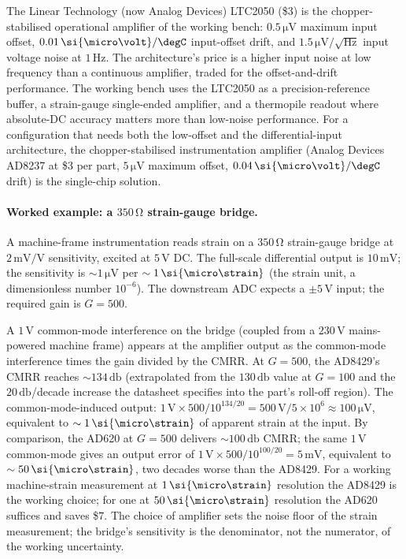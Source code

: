 The Linear Technology (now Analog Devices) LTC2050
\cite{text:ch05t3b-lt-ltc2050-datasheet} (\$$3$) is the
chopper-stabilised operational amplifier of the working bench:
$0.5 \,\si{\micro\volt}$ maximum input offset,
$0.01 \,\si{\micro\volt}/\degC$ input-offset drift, and
$1.5 \,\si{\micro\volt}/\sqrt{\si{\hertz}}$ input voltage noise at
$1 \,\si{\hertz}$. The architecture's price is a higher input noise
at low frequency than a continuous amplifier, traded for the
offset-and-drift performance. The working bench uses the LTC2050 as
a precision-reference buffer, a strain-gauge single-ended amplifier,
and a thermopile readout where absolute-DC accuracy matters more
than low-noise performance. For a configuration that needs both the
low-offset and the differential-input architecture, the
chopper-stabilised instrumentation amplifier (Analog Devices AD8237
at \$$3$ per part, $5 \,\si{\micro\volt}$ maximum offset,
$0.04 \,\si{\micro\volt}/\degC$ drift) is the single-chip solution.

\paragraph{Worked example: a $350 \,\si{\ohm}$ strain-gauge bridge.}
A machine-frame instrumentation reads strain on a
$350 \,\si{\ohm}$ strain-gauge bridge at $2 \,\si{\milli\volt}/
\si{\volt}$ sensitivity, excited at $5 \,\si{\volt}$ DC. The
full-scale differential output is $10 \,\si{\milli\volt}$; the
sensitivity is $\sim 1 \,\si{\micro\volt}$ per
$\sim 1 \,\si{\micro\strain}$ (the strain unit, a dimensionless
number $10^{-6}$). The downstream ADC expects a $\pm 5
\,\si{\volt}$ input; the required gain is $G = 500$.

A $1 \,\si{\volt}$ common-mode interference on the bridge (coupled
from a $230 \,\si{\volt}$ mains-powered machine frame) appears at
the amplifier output as the common-mode interference times the gain
divided by the CMRR. At $G = 500$, the AD8429's CMRR reaches
$\sim 134 \,\si{\decibel}$ (extrapolated from the $130 \,\si{
\decibel}$ value at $G = 100$ and the $20 \,\si{\decibel}$/decade
increase the datasheet specifies into the part's roll-off region).
The common-mode-induced output: $1 \,\si{\volt} \times 500 /
10^{134/20} = 500 \,\si{\volt} / 5 \times 10^{6} \approx
100 \,\si{\micro\volt}$, equivalent to $\sim 1 \,\si{\micro
\strain}$ of apparent strain at the input. By comparison, the AD620
at $G = 500$ delivers $\sim 100 \,\si{\decibel}$ CMRR; the same
$1 \,\si{\volt}$ common-mode gives an output error of
$1 \,\si{\volt} \times 500 / 10^{100/20} = 5 \,\si{\milli\volt}$,
equivalent to $\sim 50 \,\si{\micro\strain}$, two decades worse than
the AD8429. For a working machine-strain measurement at
$1 \,\si{\micro\strain}$ resolution the AD8429 is the working
choice; for one at $50 \,\si{\micro\strain}$ resolution the AD620
suffices and saves \$$7$. The choice of amplifier sets the noise
floor of the strain measurement; the bridge's sensitivity is the
denominator, not the numerator, of the working uncertainty.

